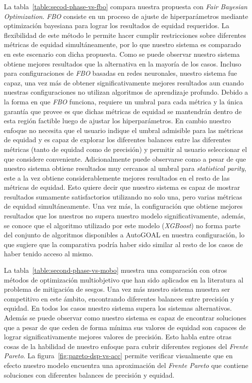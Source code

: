 La tabla~\ref{table:secod-phase-vs-fbo} compara nuestra propuesta con \emph{Fair Bayesian Optimization}.
\emph{FBO} consiste en un proceso de ajuste de hiperparámetros mediante optimización bayesiana para lograr los resultados de equidad requeridos.
La flexibilidad de este método le permite hacer cumplir restricciones sobre diferentes métricas de equidad simultáneamente, por lo que nuestro sistema es comparado en este escenario con dicha propuesta.
Como se puede observar nuestro sistema obtiene mejores resultados que la alternativa en la mayoría de los casos.
Incluso para configuraciones de \emph{FBO} basadas en redes neuronales, nuestro sistema fue capaz, una vez más de obtener significativamente mejores resultados aun cuando nuestras configuraciones no utilizan algoritmos de aprendizaje profundo.
Debido a la forma en que \emph{FBO} funciona, requiere un umbral para cada métrica y la única garantía que provee es que dichas métricas de equidad se mantendrán dentro de esta región factible luego de ajustar los hiperparámetros.
En cambio nuestro enfoque no necesita que el usuario indique el umbral admisible para las métricas de equidad y es capaz de explorar los diferentes balances entre las diferentes métricas (tanto de equidad como de precisión) y permitir al usuario seleccionar el que considere conveniente.
Adicionalmente puede observarse como a pesar de que nuestro sistema obtiene resultados muy cercanos al umbral para \emph{statistical parity}, este a la vez obtiene considerablemente mejores resultados en el resto de las métricas de equidad.
Esto quiere decir que nuestro sistema es capaz de mostrar resultados sumamente satisfactorios utilizando no solo una, pero varias métricas de equidad simultáneamente.
Una vez más, la configuración que obtiene mejores resultados que los nuestros no supera nuestro modelo significativamente, además, se conoce que el algoritmo utilizado por este modelo (\emph{XGBoost}) no forma parte del conjunto de algoritmos disponibles a AutoGOAL en nuestra configuración, lo que sugiere que la comparativa podría haber sido similar al resto de los casos de haber tenido acceso al mismo.

La tabla~\ref{table:second-phase-vs-mobo} muestra una comparación con otros métodos de optimización multiobjetivo que han sido aplicados en la literatura al problema de mitigación de sesgos.
Una vez más nuestro sistema muestra ser competitivo en este ámbito, encontrando diferentes balances entre precisión y equidad.
En todos los casos nuestro sistema supera los sistemas alternativos.
Además se puede observar como nuestro sistema es capaz de encontrar soluciones que a pesar de que ceden de forma mínima sus valores de equidad son capaces de lograr significativamente mejores valores de precisión.
Esto habla entre otras cosas de la habilidad de nuestro enfoque para cubrir diferentes regiones del \emph{Frente Pareto}.
La figura~\ref{fig:pareto-dsp-vs-acc} permite verificar visualmente que en efecto nuestro modelo encuentra una aproximación del \emph{Frente Pareto} que contiene soluciones con diferentes balances de precisión y equidad.

